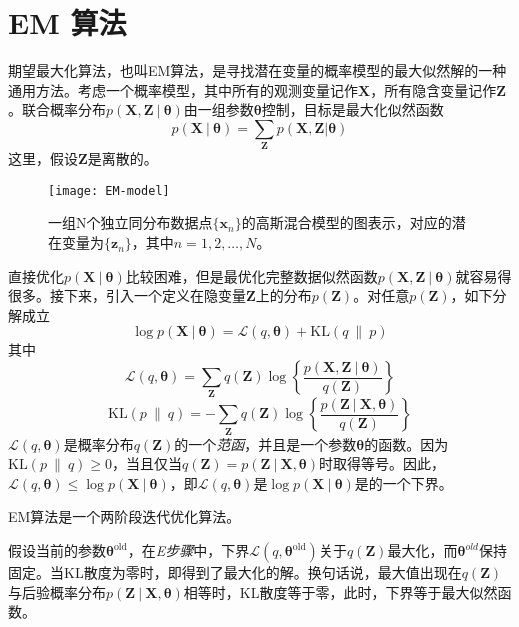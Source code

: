 \documentclass[11pt]{ctexbook}
\begin{document}
\section{EM 算法}
期望最大化算法，也叫EM算法，是寻找潜在变量的概率模型的最大似然解的一种通用方法。考虑一个概率模型，其中所有的观测变量记作$\bm X$，所有隐含变量记作$\bm Z$。联合概率分布$p(\bm X, \bm Z\ |\ \bm \theta)$由一组参数$\bm \theta $控制，目标是最大化似然函数
\begin{equation}
	p(\bm X\ |\ \bm \theta) = \sum_{\bm Z}p(\bm X, \bm Z | \bm \theta)
\end{equation}
这里，假设$\bm Z$是离散的。
\begin{figure}
	\centering
	\texttt{[image: EM-model]}
	\caption{一组N个独立同分布数据点$\{\bm x_n\}$的高斯混合模型的图表示，对应的潜在变量为$\{\bm z_n\}$，其中$n=1,2,\ldots, N$。}
	\label{fig:em-model}
\end{figure}
直接优化$p(\bm X\ |\ \bm\theta)$比较困难，但是最优化完整数据似然函数$p(\bm X, \bm Z\ |\ \bm \theta)$就容易得很多。接下来，引入一个定义在隐变量$\bm Z$上的分布$p(\bm Z)$。对任意$p(\bm Z)$，如下分解成立
\begin{equation}
	\log p(\bm X\ |\ \bm\theta) = \mathcal L(q, \bm \theta) + \mathrm{KL}(q\ \|\ p)
\end{equation}
其中
\begin{equation}
	\mathcal L(q, \bm\theta) = \sum_{\bm Z}q(\bm Z)\log\left\{ \frac{p(\bm X,\bm Z\ |\ \bm \theta)}{q(\bm Z)}\right\}
\end{equation}
\begin{equation}
	\mathrm{KL}(p\ \|\ q) = -\sum_{\bm Z}q(\bm Z)\log\left\{\frac{p(\bm Z\ |\ \bm X, \bm\theta)}{q(\bm Z)}\right\}
\end{equation}
$\mathcal L(q, \bm\theta)$是概率分布$q(\bm Z)$的一个\emph{范函}，并且是一个参数$\bm\theta$的函数。因为$\mathrm{KL}(p\ \|\ q) \geqslant 0$，当且仅当$q(\bm Z) = p(\bm Z\ |\ \bm X, \bm\theta)$时取得等号。因此，$\mathcal L(q, \bm\theta) \leqslant \log p(\bm X\ |\ \bm\theta)$，即$\mathcal L(q, \bm\theta)$是$\log p(\bm X\ |\ \bm\theta)$是的一个下界。

EM算法是一个两阶段迭代优化算法。

假设当前的参数$\bm\theta^{\mathrm{old}}$，在\emph{E步骤}中，下界$\mathcal L(q, \bm\theta^{\mathrm{old}})$关于$q(\bm Z)$最大化，而$\bm\theta^{old}$保持固定。当KL散度为零时，即得到了最大化的解。换句话说，最大值出现在$q(\bm Z)$与后验概率分布$p(\bm Z\ |\ \bm X, \bm\theta)$相等时，KL散度等于零，此时，下界等于最大似然函数。
\end{document}

